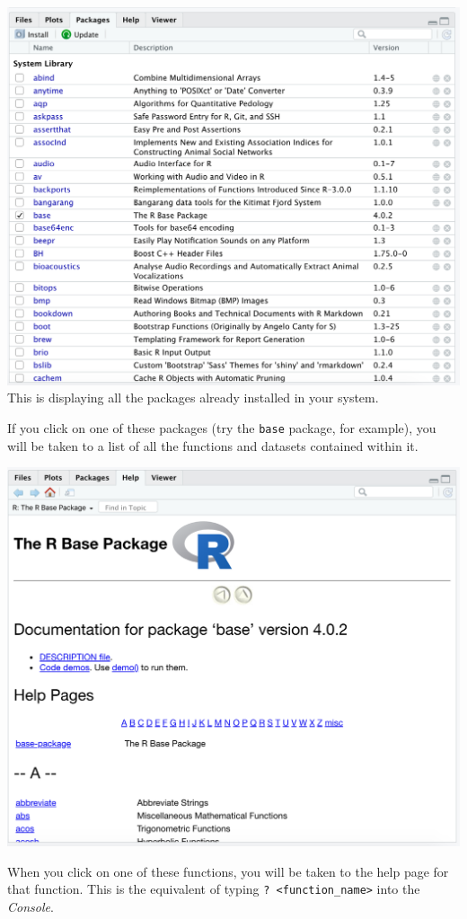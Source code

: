 \documentclass[
]{book}
\begin{document}
\includegraphics{img/rstudio_packages.png}
This is displaying all the packages already installed in your system.

If you click on one of these packages (try the \texttt{base} package, for example), you will be taken to a list of all the functions and datasets contained within it.

\includegraphics{img/rstudio_base-package.png}

When you click on one of these functions, you will be taken to the help page for that function. This is the equivalent of typing \texttt{?\ \textless{}function\_name\textgreater{}} into the \emph{Console}.
\end{document}
